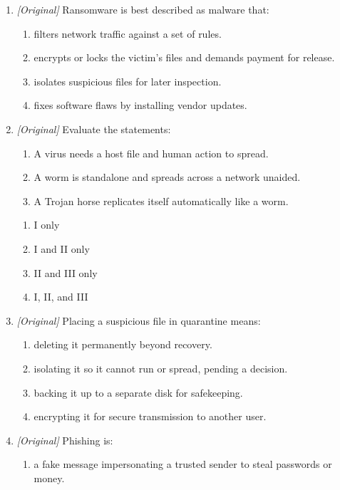 \begin{enumerate}[label=\textbf{Q\arabic*.}, leftmargin=*]
\begin{enumerate}[label=\Alph*.]
    \item It relies on the user installing it under a false disguise.
  \end{enumerate}
\item \textit{[Original]} Ransomware is best described as malware that:
  \begin{enumerate}[label=\Alph*.]
    \item filters network traffic against a set of rules.
    \item encrypts or locks the victim's files and demands payment for release.
    \item isolates suspicious files for later inspection.
    \item fixes software flaws by installing vendor updates.
  \end{enumerate}
\item \textit{[Original]} Evaluate the statements:
  \begin{enumerate}[label=\Roman*.]
    \item A virus needs a host file and human action to spread.
    \item A worm is standalone and spreads across a network unaided.
    \item A Trojan horse replicates itself automatically like a worm.
  \end{enumerate}
  \begin{enumerate}[label=\Alph*.]
    \item I only
    \item I and II only
    \item II and III only
    \item I, II, and III
  \end{enumerate}
\item \textit{[Original]} Placing a suspicious file in quarantine means:
  \begin{enumerate}[label=\Alph*.]
    \item deleting it permanently beyond recovery.
    \item isolating it so it cannot run or spread, pending a decision.
    \item backing it up to a separate disk for safekeeping.
    \item encrypting it for secure transmission to another user.
  \end{enumerate}
\item \textit{[Original]} Phishing is:
  \begin{enumerate}[label=\Alph*.]
    \item a fake message impersonating a trusted sender to steal passwords or money.

\end{enumerate}
\end{enumerate}
